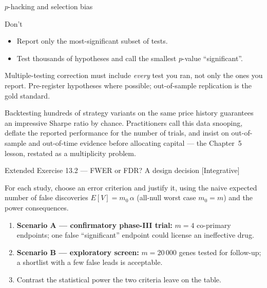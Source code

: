 \documentclass[aspectratio=169,11pt]{beamer}
\begin{document}
\begin{frame}{$p$-hacking and selection bias}
  \begin{alertblock}{Don't}
    \begin{itemize}
      \item Report only the most-significant subset of tests.
      \item Test thousands of hypotheses and call the smallest
            $p$-value ``significant''.
    \end{itemize}
  \end{alertblock}
  \begin{takeaway}
    Multiple-testing correction must include \emph{every} test you
    ran, not only the ones you report. Pre-register hypotheses where
    possible; out-of-sample replication is the gold standard.
  \end{takeaway}
  \begin{industry}
    Backtesting hundreds of strategy variants on the same price history guarantees an
    impressive Sharpe ratio by chance. Practitioners call this data snooping, deflate the
    reported performance for the number of trials, and insist on out-of-sample and
    out-of-time evidence before allocating capital --- the Chapter~5 lesson, restated as a
    multiplicity problem.
  \end{industry}
\end{frame}


\begin{frame}{Extended Exercise 13.2 --- FWER or FDR? A design decision [Integrative]}
\begin{longexercise}
  For each study, choose an error criterion and justify it, using the naive expected
  number of false discoveries $E[V]=m_0\,\alpha$ (all-null worst case $m_0=m$) and the
  power consequences.
  \begin{enumerate}
    \item \textbf{Scenario A --- confirmatory phase-III trial:} $m=4$ co-primary
          endpoints; one false ``significant'' endpoint could license an ineffective drug.
    \item \textbf{Scenario B --- exploratory screen:} $m=20\,000$ genes tested for
          follow-up; a shortlist with a few false leads is acceptable.
    \item Contrast the statistical power the two criteria leave on the table.
  \end{enumerate}
\end{longexercise}
\end{frame}
\end{document}
